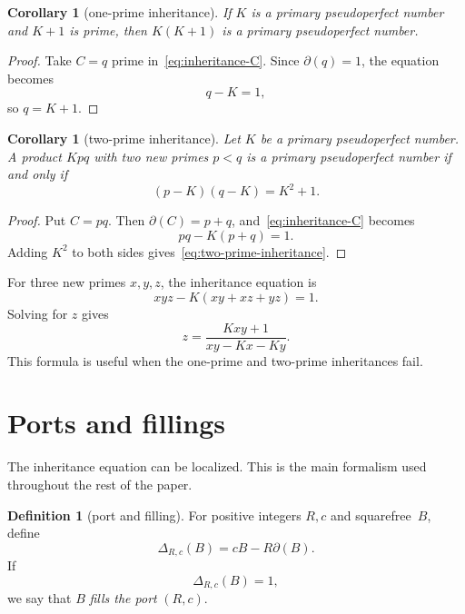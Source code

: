 \documentclass[11pt]{amsart}
\theoremstyle{plain}
\newtheorem{corollary}[theorem]{Corollary}
\theoremstyle{definition}
\newtheorem{definition}[theorem]{Definition}
\theoremstyle{remark}
\newcommand{\D}{\Delta}
\newcommand{\dd}{\partial}
\begin{document}
\begin{corollary}[one-prime inheritance]\label{cor:one-prime-inheritance}
If $K$ is a primary pseudoperfect number and $K+1$ is prime, then $K(K+1)$ is a primary pseudoperfect number.
\end{corollary}

\begin{proof}
Take $C=q$ prime in~\eqref{eq:inheritance-C}.  Since $\dd(q)=1$, the equation becomes
\[
        q-K=1,
\]
so $q=K+1$.
\end{proof}

\begin{corollary}[two-prime inheritance]\label{cor:two-prime-inheritance}
Let $K$ be a primary pseudoperfect number.  A product $Kpq$ with two new primes $p<q$ is a primary pseudoperfect number if and only if
\begin{equation}\label{eq:two-prime-inheritance}
        (p-K)(q-K)=K^2+1.
\end{equation}
\end{corollary}

\begin{proof}
Put $C=pq$.  Then $\dd(C)=p+q$, and~\eqref{eq:inheritance-C} becomes
\[
        pq-K(p+q)=1.
\]
Adding $K^2$ to both sides gives~\eqref{eq:two-prime-inheritance}.
\end{proof}

For three new primes $x,y,z$, the inheritance equation is
\[
        xyz-K(xy+xz+yz)=1.
\]
Solving for $z$ gives
\begin{equation}\label{eq:three-prime-inheritance}
        z=\frac{Kxy+1}{xy-Kx-Ky}.
\end{equation}
This formula is useful when the one-prime and two-prime inheritances fail.

\section{Ports and fillings}

The inheritance equation can be localized.  This is the main formalism used throughout the rest of the paper.

\begin{definition}[port and filling]\label{def:port}
For positive integers $R,c$ and squarefree~$B$, define
\begin{equation}\label{eq:Delta-def}
        \D_{R,c}(B)=cB-R\dd(B).
\end{equation}
If
\[
        \D_{R,c}(B)=1,
\]
we say that $B$ \emph{fills the port} $(R,c)$.
\end{definition}
\end{document}
